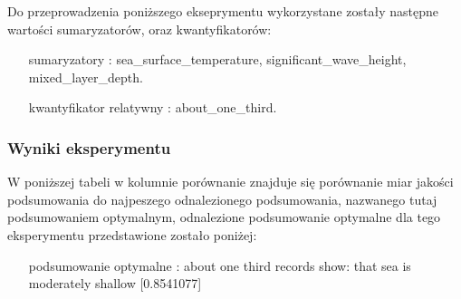 \documentclass{article}
\begin{document}
Do przeprowadzenia poniższego ekseprymentu wykorzystane zostały następne wartości sumaryzatorów, oraz kwantyfikatorów:

\begin{itemize}
    \item[sumaryzatory]: sea\_surface\_temperature, significant\_wave\_height, mixed\_layer\_depth.
    \item[kwantyfikator relatywny]: about\_one\_third.
\end{itemize}

\subsubsection{Wyniki eksperymentu}

W poniższej tabeli w kolumnie porównanie znajduje się porównanie miar jakości podsumowania do najpeszego odnalezionego podsumowania, nazwanego tutaj podsumowaniem optymalnym, odnalezione podsumowanie optymalne dla tego eksperymentu przedstawione zostało poniżej:

\begin{itemize}
    \item[podsumowanie optymalne]: about one third records show: that sea is moderately shallow  [0.8541077]
\end{itemize}
\end{document}
